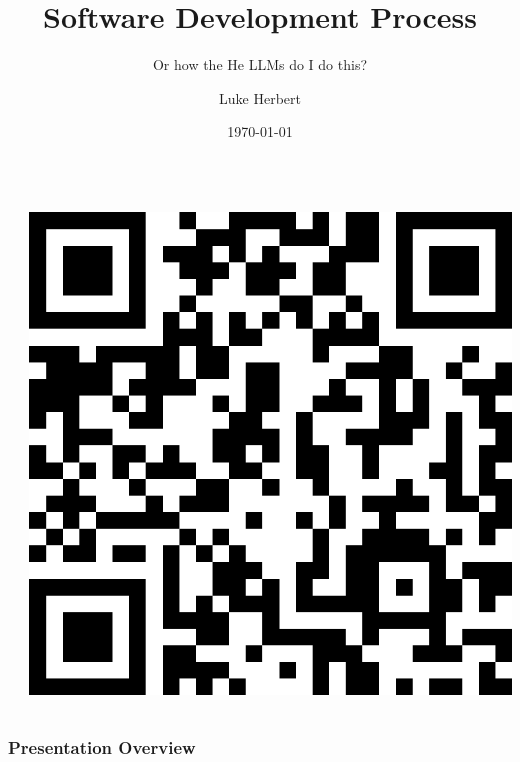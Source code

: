 \documentclass{beamer}
\title{Software Development Process}
\subtitle{Or how the He LLMs do I do this?}
\author{Luke Herbert}
\date{\today}
\begin{document}
\begin{frame}[plain]
    \begin{columns}[T]
        \begin{column}{0.6\textwidth}
            \titlepage
        \end{column}
        \begin{column}{0.4\textwidth}
            \vspace{1cm}
            \includegraphics[width=\textwidth]{QR Code for LLM use.png}
        \end{column}
    \end{columns}
\end{frame}

\begin{frame}
    \frametitle{Presentation Overview}
    \tableofcontents
\end{frame}
\end{document}
